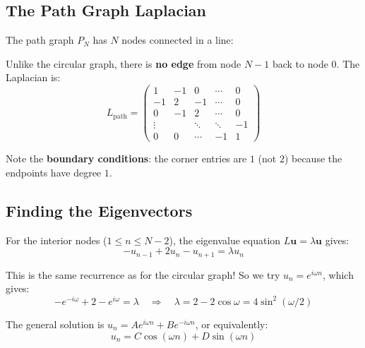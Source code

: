 \begin{notechapter}
\subsection{The Path Graph Laplacian}

The path graph $P_N$ has $N$ nodes connected in a line:
\begin{center}
\end{center}

Unlike the circular graph, there is \textbf{no edge} from node $N-1$ 
back to node $0$. The Laplacian is:
\[
L_{\text{path}} = \begin{pmatrix}
1 & -1 & 0 & \cdots & 0 \\
-1 & 2 & -1 & \cdots & 0 \\
0 & -1 & 2 & \cdots & 0 \\
\vdots & & \ddots & \ddots & -1 \\
0 & 0 & \cdots & -1 & 1
\end{pmatrix}
\]

Note the \textbf{boundary conditions}: the corner entries are $1$ (not 
$2$) because the endpoints have degree $1$.

\subsection{Finding the Eigenvectors}

For the interior nodes ($1 \leq n \leq N-2$), the eigenvalue equation 
$L\mathbf{u} = \lambda \mathbf{u}$ gives:
\[
-u_{n-1} + 2u_n - u_{n+1} = \lambda u_n
\]

This is the same recurrence as for the circular graph! So we try 
$u_n = e^{i\omega n}$, which gives:
\[
-e^{-i\omega} + 2 - e^{i\omega} = \lambda 
\quad \Rightarrow \quad 
\lambda = 2 - 2\cos\omega = 4\sin^2(\omega/2)
\]

The general solution is $u_n = A e^{i\omega n} + B e^{-i\omega n}$, or 
equivalently:
\[
u_n = C \cos(\omega n) + D \sin(\omega n)
\]


\end{notechapter}
